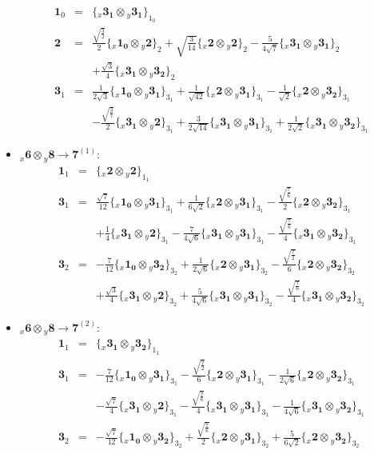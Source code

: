 \documentclass[english]{article}
\newcommand{\rep}[1]{\mathbf{#1}}
\newcommand{\repx}[2]{{}_{#2}\mathbf{#1}}
\newcommand{\subcg}[3]{\big\{ \repx{#1}{x}\otimes\repx{#2}{y}\big\}^{}_{#3}}
\begin{document}
\begin{itemize}
\begin{eqnarray*}
\rep{1}_{0} &=& \subcg{3_{1}}{3_{1}}{1_{0}}
\\
\rep{2} &=& \frac{\sqrt{\frac{3}{2}}}{2}\subcg{1_{0}}{2}{2}+\sqrt{\frac{3}{14}}\subcg{2}{2}{2}-\frac{5}{4 \sqrt{7}}\subcg{3_{1}}{3_{1}}{2} \\ 
 & & +\frac{\sqrt{3}}{4}\subcg{3_{1}}{3_{2}}{2}
\\
\rep{3}_{1} &=& \frac{1}{2 \sqrt{3}}\subcg{1_{0}}{3_{1}}{3_{1}}+\frac{1}{\sqrt{42}}\subcg{2}{3_{1}}{3_{1}}-\frac{1}{\sqrt{2}}\subcg{2}{3_{2}}{3_{1}} \\ 
 & & -\frac{\sqrt{\frac{3}{7}}}{2}\subcg{3_{1}}{2}{3_{1}}+\frac{3}{2 \sqrt{14}}\subcg{3_{1}}{3_{1}}{3_{1}}+\frac{1}{2 \sqrt{2}}\subcg{3_{1}}{3_{2}}{3_{1}}
\end{eqnarray*}
\item $\repx{6}{x}\otimes\repx{8}{y}\to\rep{7}^{(1)}$:
\begin{eqnarray*}
\rep{1}_{1} &=& \subcg{2}{2}{1_{1}}
\\
\rep{3}_{1} &=& \frac{\sqrt{7}}{12}\subcg{1_{0}}{3_{1}}{3_{1}}+\frac{1}{6 \sqrt{2}}\subcg{2}{3_{1}}{3_{1}}-\frac{\sqrt{\frac{7}{6}}}{2}\subcg{2}{3_{2}}{3_{1}} \\ 
 & & +\frac{1}{4}\subcg{3_{1}}{2}{3_{1}}-\frac{7}{4 \sqrt{6}}\subcg{3_{1}}{3_{1}}{3_{1}}-\frac{\sqrt{\frac{7}{6}}}{4}\subcg{3_{1}}{3_{2}}{3_{1}}
\\
\rep{3}_{2} &=& -\frac{7}{12}\subcg{1_{0}}{3_{2}}{3_{2}}+\frac{1}{2 \sqrt{6}}\subcg{2}{3_{1}}{3_{2}}-\frac{\sqrt{\frac{7}{2}}}{6}\subcg{2}{3_{2}}{3_{2}} \\ 
 & & +\frac{\sqrt{3}}{4}\subcg{3_{1}}{2}{3_{2}}+\frac{5}{4 \sqrt{6}}\subcg{3_{1}}{3_{1}}{3_{2}}-\frac{\sqrt{\frac{7}{6}}}{4}\subcg{3_{1}}{3_{2}}{3_{2}}
\end{eqnarray*}
\item $\repx{6}{x}\otimes\repx{8}{y}\to\rep{7}^{(2)}$:
\begin{eqnarray*}
\rep{1}_{1} &=& \subcg{3_{1}}{3_{2}}{1_{1}}
\\
\rep{3}_{1} &=& -\frac{7}{12}\subcg{1_{0}}{3_{1}}{3_{1}}-\frac{\sqrt{\frac{7}{2}}}{6}\subcg{2}{3_{1}}{3_{1}}-\frac{1}{2 \sqrt{6}}\subcg{2}{3_{2}}{3_{1}} \\ 
 & & -\frac{\sqrt{7}}{4}\subcg{3_{1}}{2}{3_{1}}-\frac{\sqrt{\frac{7}{6}}}{4}\subcg{3_{1}}{3_{1}}{3_{1}}-\frac{1}{4 \sqrt{6}}\subcg{3_{1}}{3_{2}}{3_{1}}
\\
\rep{3}_{2} &=& -\frac{\sqrt{7}}{12}\subcg{1_{0}}{3_{2}}{3_{2}}+\frac{\sqrt{\frac{7}{6}}}{2}\subcg{2}{3_{1}}{3_{2}}+\frac{5}{6 \sqrt{2}}\subcg{2}{3_{2}}{3_{2}} \\ 

\end{eqnarray*}
\end{itemize}
\end{document}

